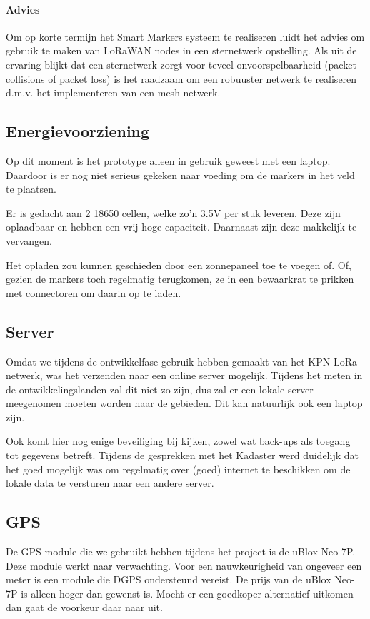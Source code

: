 \paragraph{Advies}
Om op korte termijn het Smart Markers systeem te realiseren luidt het advies om
gebruik te maken van LoRaWAN nodes in een sternetwerk opstelling. Als uit de
ervaring blijkt dat een sternetwerk zorgt voor teveel onvoorspelbaarheid (packet
collisions of packet loss) is het raadzaam om een robuuster netwerk te
realiseren d.m.v. het implementeren van een mesh-netwerk.

\subsection{Energievoorziening}
Op dit moment is het prototype alleen in gebruik geweest met een laptop. Daardoor
is er nog niet serieus gekeken naar voeding om de markers in het veld te plaatsen.

Er is gedacht aan 2 18650 cellen, welke zo'n 3.5V per stuk leveren. Deze zijn
oplaadbaar en hebben een vrij hoge capaciteit. Daarnaast zijn deze makkelijk te
vervangen.

Het opladen zou kunnen geschieden door een zonnepaneel toe te voegen of. Of, gezien
de markers toch regelmatig terugkomen, ze in een bewaarkrat te prikken met connectoren
om daarin op te laden.

\subsection{Server}
Omdat we tijdens de ontwikkelfase gebruik hebben gemaakt van het KPN LoRa netwerk, was
het verzenden naar een online server mogelijk.
Tijdens het meten in de ontwikkelingslanden zal dit niet zo zijn, dus zal er een lokale
server meegenomen moeten worden naar de gebieden. Dit kan natuurlijk ook een laptop zijn.

Ook komt hier nog enige beveiliging bij kijken, zowel wat back-ups als toegang tot
gegevens betreft. Tijdens de gesprekken met het Kadaster werd duidelijk dat het goed
mogelijk was om regelmatig over (goed) internet te beschikken om de lokale data te
versturen naar een andere server.

\subsection{GPS}
De GPS-module die we gebruikt hebben tijdens het project is de uBlox Neo-7P.
Deze module werkt naar verwachting. Voor een nauwkeurigheid van ongeveer een
meter is een module die DGPS ondersteund vereist. De prijs van de uBlox Neo-7P
is alleen hoger dan gewenst is. Mocht er een goedkoper alternatief uitkomen dan
gaat de voorkeur daar naar uit. 

